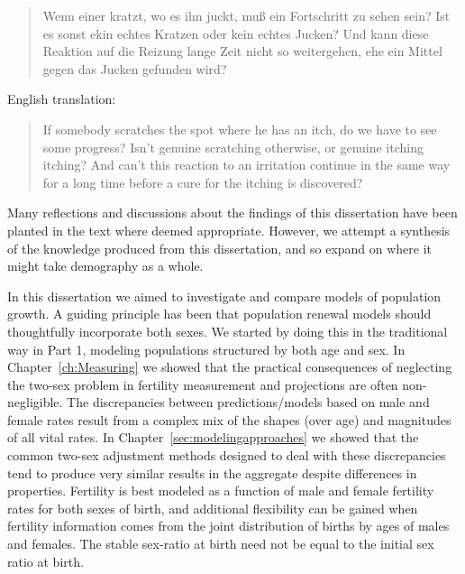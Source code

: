 \FloatBarrier
\label{sec:reflections}

\begin{singlespace}
\begin{quote}
Wenn einer kratzt, wo es ihn juckt, mu{\ss} ein Fortschritt zu sehen sein? Ist
es sonst ekin echtes Kratzen oder kein echtes Jucken? Und kann diese Reaktion
auf die Reizung lange Zeit nicht so weitergehen, ehe ein Mittel gegen das Jucken
gefunden wird?
\citep{wittgenstein1984culture}
\end{quote}

English translation:
\begin{quote}
 If somebody scratches the spot where he has an itch, do we have to see 
 some progress? Isn't genuine scratching otherwise, or genuine itching 
itching? And can't this reaction to an irritation continue in the 
same way for a long time before a cure for the itching is discovered?
\citep{wittgenstein1984culture}
\end{quote}
\end{singlespace}

Many reflections and discussions about the findings of this dissertation have
been planted in the text where deemed appropriate. However, we attempt a
synthesis of the knowledge produced from this dissertation, and so expand on
where it might take demography as a whole. 

In this dissertation we aimed to investigate and compare models of
population growth. A guiding principle has been that population renewal models
should thoughtfully incorporate both sexes. We started by doing this in the
traditional way in Part 1, modeling populations structured by both age and sex. In
Chapter~\ref{ch:Measuring} we showed that the practical consequences of
neglecting the two-sex problem in fertility measurement and projections are
often non-negligible. The discrepancies between predictions/models based on male
and female rates result from a complex mix of the shapes (over age) and
magnitudes of all vital rates. In Chapter~\ref{sec:modelingapproaches} we showed
that the common two-sex adjustment methods designed to deal with these
discrepancies tend to produce very similar results in the aggregate despite
differences in properties. Fertility is best modeled as a function of male and
female fertility rates for both sexes of birth, and additional flexibility can
be gained when fertility information comes from the joint distribution of births by ages of males and females. The stable sex-ratio at birth need not be equal to the initial sex ratio at birth.

